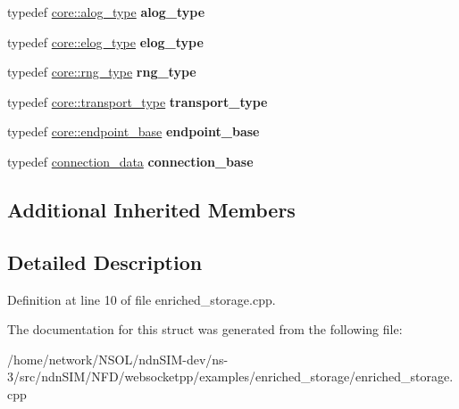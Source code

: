 \begin{DoxyCompactItemize}
\item 
typedef \hyperlink{classwebsocketpp_1_1log_1_1basic}{core\+::alog\+\_\+type} {\bfseries alog\+\_\+type}\hypertarget{structcustom__config_aa4765c4c6de021a7de3682018a7f8e0b}{}\label{structcustom__config_aa4765c4c6de021a7de3682018a7f8e0b}

\item 
typedef \hyperlink{classwebsocketpp_1_1log_1_1basic}{core\+::elog\+\_\+type} {\bfseries elog\+\_\+type}\hypertarget{structcustom__config_aaa6ac45181509874f7f0469004530fa1}{}\label{structcustom__config_aaa6ac45181509874f7f0469004530fa1}

\item 
typedef \hyperlink{classwebsocketpp_1_1random_1_1none_1_1int__generator}{core\+::rng\+\_\+type} {\bfseries rng\+\_\+type}\hypertarget{structcustom__config_a6107db98303c887d15ceb880a6c62622}{}\label{structcustom__config_a6107db98303c887d15ceb880a6c62622}

\item 
typedef \hyperlink{classwebsocketpp_1_1transport_1_1asio_1_1endpoint}{core\+::transport\+\_\+type} {\bfseries transport\+\_\+type}\hypertarget{structcustom__config_a8ea1acf1c4cf264a0e36c998ba8896db}{}\label{structcustom__config_a8ea1acf1c4cf264a0e36c998ba8896db}

\item 
typedef \hyperlink{structwebsocketpp_1_1config_1_1core_a5389422816ef3115fb8b7f4cd92d5ca3}{core\+::endpoint\+\_\+base} {\bfseries endpoint\+\_\+base}\hypertarget{structcustom__config_aecf6c7916dfb86a9c27561ada3ce359d}{}\label{structcustom__config_aecf6c7916dfb86a9c27561ada3ce359d}

\item 
typedef \hyperlink{structconnection__data}{connection\+\_\+data} {\bfseries connection\+\_\+base}\hypertarget{structcustom__config_adaf44f05360e52fd2fa26f4e45eeaec4}{}\label{structcustom__config_adaf44f05360e52fd2fa26f4e45eeaec4}

\end{DoxyCompactItemize}
\subsection*{Additional Inherited Members}


\subsection{Detailed Description}


Definition at line 10 of file enriched\+\_\+storage.\+cpp.



The documentation for this struct was generated from the following file\+:\begin{DoxyCompactItemize}
\item 
/home/network/\+N\+S\+O\+L/ndn\+S\+I\+M-\/dev/ns-\/3/src/ndn\+S\+I\+M/\+N\+F\+D/websocketpp/examples/enriched\+\_\+storage/enriched\+\_\+storage.\+cpp\end{DoxyCompactItemize}
